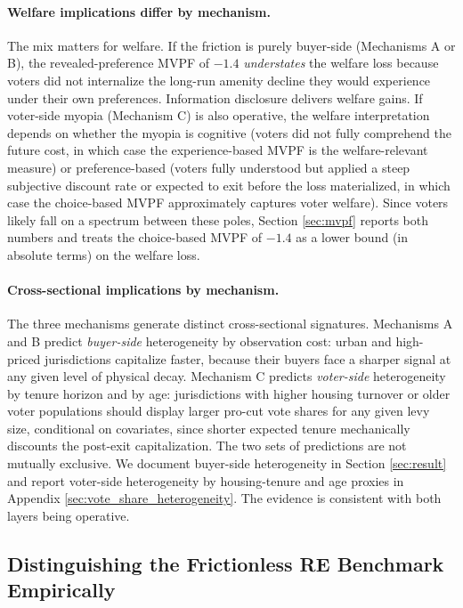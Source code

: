 \paragraph{Welfare implications differ by mechanism.}
The mix matters for welfare. If the friction is purely buyer-side (Mechanisms A or B), the revealed-preference MVPF of $-1.4$ {\it understates} the welfare loss because voters did not internalize the long-run amenity decline they would experience under their own preferences. Information disclosure delivers welfare gains. If voter-side myopia (Mechanism C) is also operative, the welfare interpretation depends on whether the myopia is cognitive (voters did not fully comprehend the future cost, in which case the experience-based MVPF is the welfare-relevant measure) or preference-based (voters fully understood but applied a steep subjective discount rate or expected to exit before the loss materialized, in which case the choice-based MVPF approximately captures voter welfare). Since voters likely fall on a spectrum between these poles, Section \ref{sec:mvpf} reports both numbers and treats the choice-based MVPF of $-1.4$ as a lower bound (in absolute terms) on the welfare loss.

\paragraph{Cross-sectional implications by mechanism.}
The three mechanisms generate distinct cross-sectional signatures. Mechanisms A and B predict {\it buyer-side} heterogeneity by observation cost: urban and high-priced jurisdictions capitalize faster, because their buyers face a sharper signal at any given level of physical decay. Mechanism C predicts {\it voter-side} heterogeneity by tenure horizon and by age: jurisdictions with higher housing turnover or older voter populations should display larger pro-cut vote shares for any given levy size, conditional on covariates, since shorter expected tenure mechanically discounts the post-exit capitalization. The two sets of predictions are not mutually exclusive. We document buyer-side heterogeneity in Section \ref{sec:result} and report voter-side heterogeneity by housing-tenure and age proxies in Appendix \ref{sec:vote_share_heterogeneity}. The evidence is consistent with both layers being operative.

\subsection{Distinguishing the Frictionless RE Benchmark Empirically}

